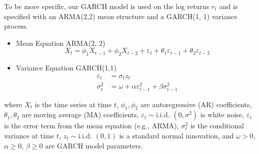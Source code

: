 \documentclass[10pt]{article}
\begin{document}
\noindent
To be more specific, our GARCH model is used on the log returns $r_t$ and is specified with an ARMA(2,2) mean structure and a GARCH(1, 1) variance process. 

\begin{itemize}
    \item Mean Equation ARMA(2, 2)
    \begin{equation}
    X_t = \phi_1 X_{t-1} + \phi_2 X_{t-2} + \varepsilon_t + \theta_1 \varepsilon_{t-1} + \theta_2 \varepsilon_{t-2}
    \end{equation}
    \item Variance Equation GARCH(1,1)
    \begin{align}
    \varepsilon_t &= \sigma_t z_t \\
    \sigma_t^2 &= \omega + \alpha \varepsilon_{t-1}^2 + \beta \sigma_{t-1}^2
    \end{align}
\end{itemize}
where \( X_t \) is the time series at time \( t \), \( \phi_1, \phi_2 \) are autoregressive (AR) coefficients, \( \theta_1, \theta_2 \) are moving average (MA) coefficients, \( \varepsilon_t \sim \text{i.i.d. } (0, \sigma^2) \) is white noise, \( \varepsilon_t \) is the error term from the mean equation (e.g., ARMA), \( \sigma_t^2 \) is the conditional variance at time \( t \), \( z_t \sim \text{i.i.d. } (0, 1) \) is a standard normal innovation, and \( \omega > 0 \), \( \alpha \geq 0 \), \( \beta \geq 0 \) are GARCH model parameters.
\end{document}
